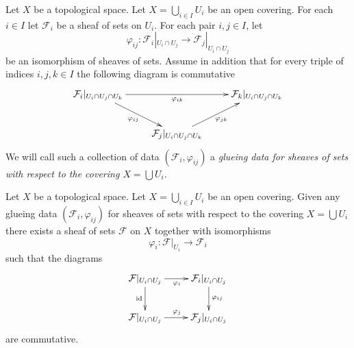 \medskip\noindent
Let $X$ be a topological space.
Let $X = \bigcup_{i\in I} U_i$ be an open covering.
For each $i \in I$ let $\mathcal{F}_i$ be a sheaf of sets on $U_i$.
For each pair $i, j \in I$, let
$$
\varphi_{ij} :
\mathcal{F}_i|_{U_i \cap U_j}
\longrightarrow
\mathcal{F}_j|_{U_i \cap U_j}
$$
be an isomorphism of sheaves of sets. Assume in addition
that for every triple of indices $i, j, k \in I$ the
following diagram is commutative
$$
\xymatrix{
\mathcal{F}_i|_{U_i \cap U_j \cap U_k}
\ar[rr]_{\varphi_{ik}}
\ar[rd]_{\varphi_{ij}} & &
\mathcal{F}_k|_{U_i \cap U_j \cap U_k} \\
&
\mathcal{F}_j|_{U_i \cap U_j \cap U_k}
\ar[ru]_{\varphi_{jk}}
}
$$
We will call such a collection of data
$(\mathcal{F}_i, \varphi_{ij})$
a {\it glueing data for sheaves of sets with respect to
the covering $X = \bigcup U_i$}.

\begin{lemma}
\label{lemma-glue-sheaves}
Let $X$ be a topological space.
Let $X = \bigcup_{i\in I} U_i$ be an open covering.
Given any glueing data $(\mathcal{F}_i, \varphi_{ij})$
for sheaves of sets with respect to the covering $X = \bigcup U_i$
there exists a sheaf of sets $\mathcal{F}$ on $X$
together with isomorphisms
$$
\varphi_i : \mathcal{F}|_{U_i} \to \mathcal{F}_i
$$
such that the diagrams
$$
\xymatrix{
\mathcal{F}|_{U_i \cap U_j} \ar[r]_{\varphi_i} \ar[d]_{\text{id}} &
\mathcal{F}_i|_{U_i \cap U_j} \ar[d]^{\varphi_{ij}} \\
\mathcal{F}|_{U_i \cap U_j} \ar[r]^{\varphi_j} &
\mathcal{F}_j|_{U_i \cap U_j}
}
$$
are commutative.
\end{lemma}

